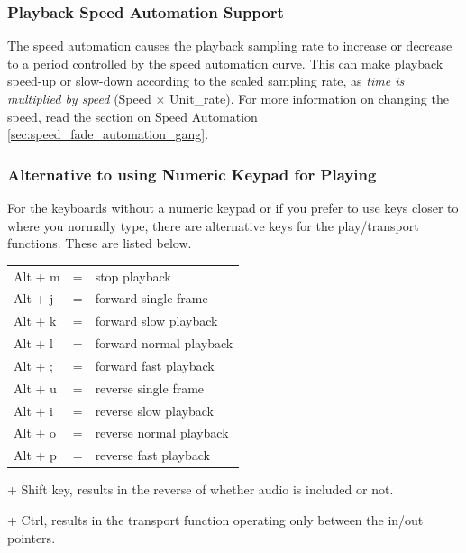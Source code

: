 \subsubsection*{Playback Speed Automation Support}%
\label{ssub:playback_speed_automation_support}


The speed automation causes the playback sampling rate to increase or decrease to a period controlled by the speed automation curve.  
This can make playback speed-up or slow-down according to the scaled sampling rate, as \textit{time is multiplied by speed} (Speed $\times$ Unit\_rate). For more information on changing
the speed, read the section on Speed Automation \ref{sec:speed_fade_automation_gang}.

\subsubsection*{Alternative to using Numeric Keypad for Playing}%
\label{ssub:alternative_to_using_numeric_keypad_for_playing}


For the keyboards without a numeric keypad or if you prefer to use keys closer to where you normally type, there are alternative keys for the play/transport functions.  These are listed below.

\begin{tabular}{lcl}
	Alt + m&=&stop playback\\

	Alt + j&=&forward single frame\\

	Alt + k&=&forward slow playback\\

	Alt + l&=&forward normal playback\\

	Alt + ;&=&forward fast playback\\

	Alt + u&=&reverse single frame\\

	Alt + i&=&reverse slow playback\\

	Alt + o&=&reverse normal playback\\

	Alt + p&=&reverse fast playback\\
\end{tabular}
\begin{minipage}{.45\linewidth}
+ Shift key, results in the reverse of whether audio is included or not.
\vspace{1ex}

+ Ctrl, results in the transport function operating only between the in/out pointers.
\end{minipage}


